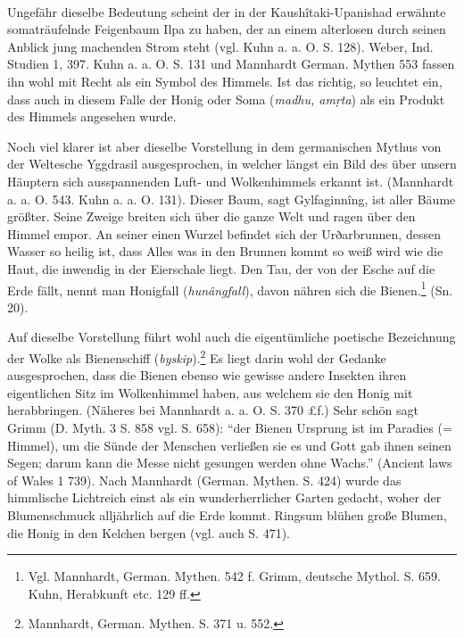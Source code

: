 \documentclass[a4paper, 11pt, oneside]{article}
\begin{document}
\paragraph{}
Ungefähr dieselbe Bedeutung scheint der in der Kaushîtaki-Upanishad erwähnte somaträufelnde Feigenbaum Ilpa zu haben, der an einem alterlosen durch seinen Anblick jung machenden Strom steht (vgl. Kuhn a. a. O. S. 128). Weber, Ind. Studien 1, 397. Kuhn a. a. O. S. 131 und Mannhardt German. Mythen 553 fassen ihn wohl mit Recht als ein Symbol des Himmels. Ist das richtig, so leuchtet ein, dass auch in diesem Falle der Honig oder Soma (\emph{madhu, amṛta}) als ein Produkt des Himmels angesehen wurde.

Noch viel klarer ist aber dieselbe Vorstellung in dem germanischen Mythus von der Weltesche Yggdrasil ausgesprochen, in welcher längst ein Bild des über unsern Häuptern sich ausspannenden Luft- und Wolkenhimmels erkannt ist. (Mannhardt a. a. O. 543. Kuhn a. a. O. 131). Dieser Baum, sagt Gylfaginnîng, ist aller Bäume größter. Seine Zweige breiten sich über die ganze Welt und ragen über den Himmel empor. An seiner einen Wurzel befindet sich der Urðarbrunnen, dessen Wasser so heilig ist, dass Alles was in den Brunnen kommt so weiß wird wie die Haut, die inwendig in der Eierschale liegt. Den Tau, der von der Esche auf die Erde fällt, nennt man Honigfall (\emph{hunângfall}), davon nähren sich die Bienen.\footnote{Vgl. Mannhardt, German. Mythen. 542 f. Grimm, deutsche Mythol. S. 659. Kuhn, Herabkunft etc. 129 ff.} (Sn. 20).

Auf dieselbe Vorstellung führt wohl auch die eigentümliche poetische Bezeichnung der Wolke als Bienenschiff (\emph{byskip}).\footnote{Mannhardt, German. Mythen. S. 371 u. 552.} Es liegt darin wohl der Gedanke ausgesprochen, dass die Bienen ebenso wie gewisse andere Insekten ihren eigentlichen Sitz im Wolkenhimmel haben, aus welchem sie den Honig mit herabbringen. (Näheres bei Mannhardt a. a. O. S. 370 £f.) Sehr schön sagt Grimm (D. Myth. 3 S. 858 vgl. S. 658): "`der Bienen Ursprung ist im Paradies (= Himmel), um die Sünde der Menschen verließen sie es und Gott gab ihnen seinen Segen; darum kann die Messe nicht gesungen werden ohne Wachs."' (Ancient laws of Wales 1 739). Nach Mannhardt (German. Mythen. S. 424) wurde das himmlische Lichtreich einst als ein wunderherrlicher Garten gedacht, woher der Blumenschmuck alljährlich auf die Erde kommt. Ringsum blühen große Blumen, die Honig in den Kelchen bergen (vgl. auch S. 471).
\end{document}
